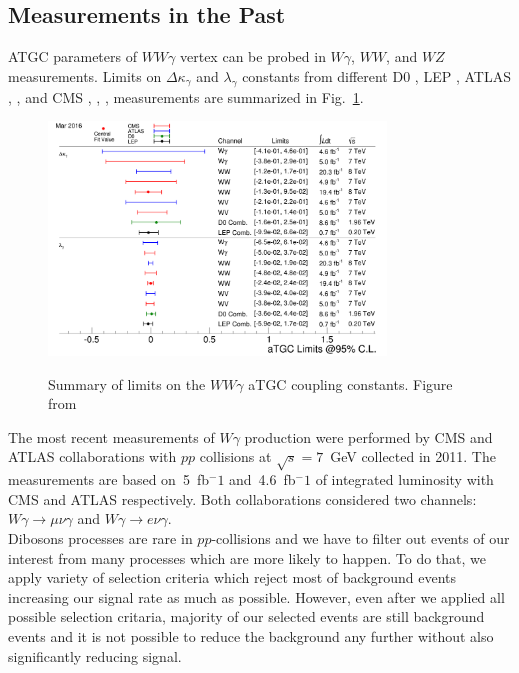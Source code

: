 \subsection{Measurements in the Past}

ATGC parameters of $WW\gamma$ vertex can be probed in $W\gamma$, $WW$, and $WZ$ measurements. Limits on $\Delta \kappa_\gamma$ and $\lambda_\gamma$ constants from different D0 \cite{ref_D0_aTGC_comb}, LEP \cite{ref_LEP_aTGC_comb}, ATLAS \cite{ref_7TeV_ATLAS}, \cite{ref_ATLAS_WW_8TeV}, \cite{ref_ATLAS_VW_8TeV} and CMS \cite{ref_7TeV_CMS}, \cite{ref_CMS_WW_7TeV}, \cite{ref_CMS_WW_8TeV}, \cite{ref_CMS_VW_7TeV} measurements are summarized in Fig.~\ref{fig:aTGC_cg}.\\ 

\begin{figure}[htb]
  \begin{center}
    {\includegraphics[width=0.80\textwidth]{../figs/WgAbout/aTGC_cg.png}}
    \caption{Summary of limits on the $WW\gamma$ aTGC coupling constants. Figure from \cite{ref_twiki_SMP_ATGC}}
    \label{fig:aTGC_cg}
  \end{center}
\end{figure}

The most recent measurements of $W\gamma$ production were performed by CMS \cite{ref_7TeV_CMS} and ATLAS \cite{ref_7TeV_ATLAS} collaborations with $pp$ collisions at $\sqrt{s}=7$~GeV collected in 2011. The measurements are based on~5~fb$^-1$ and~4.6~fb$^-1$ of integrated luminosity with CMS and ATLAS respectively. Both collaborations considered two channels: $W\gamma\rightarrow\mu\nu\gamma$ and $W\gamma\rightarrow e\nu\gamma$.\\

Dibosons processes are rare in $pp$-collisions and we have to filter out events of our interest from many processes which are more likely to happen. To do that, we apply variety of selection criteria which reject most of background events increasing our signal rate as much as possible. However, even after we applied all possible selection critaria, majority of our selected events are still background events and it is not possible to reduce the background any further without also significantly reducing signal.\\


